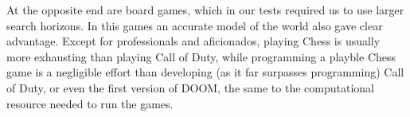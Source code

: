 \documentclass{article}
\begin{document}
\begin{flushleft}
At the opposite end are board games, which in our
tests required us to use larger search
horizons.
In this games an accurate model of the world
also gave clear advantage.
Except for professionals and
aficionados, playing Chess is usually more exhausting than
playing Call of Duty, 
while programming a playble Chess game is a negligible
effort than developing (as it far surpasses programming) Call of Duty,
or even the first version of DOOM, the same to the computational
resource needed to run the games.









\end{flushleft}
\end{document}
